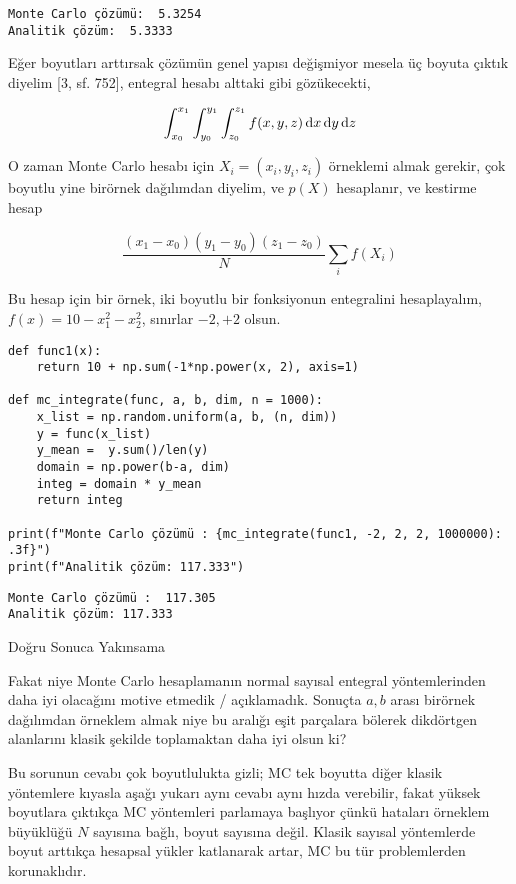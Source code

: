 \documentclass[12pt,fleqn]{article}\usepackage{../../common}
\begin{document}
\begin{verbatim}
Monte Carlo çözümü:  5.3254
Analitik çözüm:  5.3333
\end{verbatim}

Eğer boyutları arttırsak çözümün genel yapısı değişmiyor mesela üç boyuta çıktık
diyelim [3, sf. 752], entegral hesabı alttaki gibi gözükecekti,

$$
\int_{x_0}^{x_1} \int_{y_0}^{y_1} \int_{z_0}^{z_1}  f(x,y,z) \,\mathrm{d} x \,\mathrm{d} y \,\mathrm{d} z
$$

O zaman Monte Carlo hesabı için $X_i = (x_i,y_i,z_i)$ örneklemi almak gerekir,
çok boyutlu yine birörnek dağılımdan diyelim, ve $p(X)$ hesaplanır, ve kestirme
hesap

$$
\frac{(x_1-x_0)(y_1-y_0)(z_1-z_0)}{N} \sum_i f(X_i)
$$

Bu hesap için bir örnek, iki boyutlu bir fonksiyonun entegralini hesaplayalım,
$f(x) = 10 - x_1^2 - x_2^2$, sınırlar $-2,+2$ olsun.

\begin{verbatim}
def func1(x):
    return 10 + np.sum(-1*np.power(x, 2), axis=1)
  
def mc_integrate(func, a, b, dim, n = 1000):
    x_list = np.random.uniform(a, b, (n, dim))
    y = func(x_list)
    y_mean =  y.sum()/len(y)
    domain = np.power(b-a, dim)
    integ = domain * y_mean
    return integ

print(f"Monte Carlo çözümü : {mc_integrate(func1, -2, 2, 2, 1000000): .3f}")
print(f"Analitik çözüm: 117.333")
\end{verbatim}

\begin{verbatim}
Monte Carlo çözümü :  117.305
Analitik çözüm: 117.333
\end{verbatim}

Doğru Sonuca Yakınsama

Fakat niye Monte Carlo hesaplamanın normal sayısal entegral yöntemlerinden daha
iyi olacağını motive etmedik / açıklamadık. Sonuçta $a,b$ arası birörnek
dağılımdan örneklem almak niye bu aralığı eşit parçalara bölerek dikdörtgen
alanlarını klasik şekilde toplamaktan daha iyi olsun ki?

Bu sorunun cevabı çok boyutlulukta gizli; MC tek boyutta diğer klasik yöntemlere
kıyasla aşağı yukarı aynı cevabı aynı hızda verebilir, fakat yüksek boyutlara
çıktıkça MC yöntemleri parlamaya başlıyor çünkü hataları örneklem büyüklüğü $N$
sayısına bağlı, boyut sayısına değil. Klasik sayısal yöntemlerde boyut arttıkça
hesapsal yükler katlanarak artar, MC bu tür problemlerden korunaklıdır.
\end{document}
